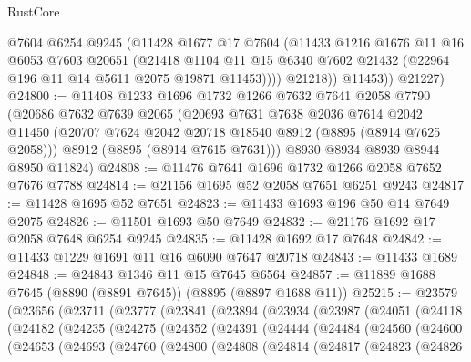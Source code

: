 \begin{lexlean}{RustCore}
\begin{coremodule}
              @7604
              @6254
              @9245
              (@11428
                @1677
                @17
                @7604
                (@11433
                  @1216
                  @1676
                  @11
                  @16
                  @6053
                  @7603
                  @20651
                  (@21418
                    @1104
                    @11
                    @15
                    @6340
                    @7602
                    @21432
                    (@22964 @196 @11 @14 @5611 @2075 @19871 @11453))))
              @21218))
          @11453))
      @21227)
@24800 := @11408
    @1233
    @1696
    @1732
    @1266
    @7632
    @7641
    @2058
    @7790
    (@20686
      @7632
      @7639
      @2065
      (@20693
        @7631
        @7638
        @2036
        @7614
        @2042
        @11450
        (@20707 @7624 @2042 @20718 @18540 @8912 (@8895 (@8914 @7625 @2058)))
        @8912
        (@8895 (@8914 @7615 @7631)))
      @8930
      @8934
      @8939
      @8944
      @8950
      @11824)
@24808 := @11476 @7641 @1696 @1732 @1266 @2058 @7652 @7676 @7788
@24814 := @21156 @1695 @52 @2058 @7651 @6251 @9243
@24817 := @11428 @1695 @52 @7651
@24823 := @11433 @1693 @196 @50 @14 @7649 @2075
@24826 := @11501 @1693 @50 @7649
@24832 := @21176 @1692 @17 @2058 @7648 @6254 @9245
@24835 := @11428 @1692 @17 @7648
@24842 := @11433 @1229 @1691 @11 @16 @6090 @7647 @20718
@24843 := @11433 @1689
@24848 := @24843 @1346 @11 @15 @7645 @6564
@24857 := @11889 @1688 @7645 (@8890 (@8891 @7645)) (@8895 (@8897 @1688 @11))
@25215 := @23579
    (@23656
      (@23711
        (@23777
          (@23841
            (@23894
              (@23934
                (@23987
                  (@24051
                    (@24118
                      (@24182
                        (@24235
                          (@24275
                            (@24352
                              (@24391
                                (@24444
                                  (@24484
                                    (@24560
                                      (@24600
                                        (@24653
                                          (@24693
                                            (@24760
                                              (@24800
                                                (@24808
                                                  (@24814
                                                    (@24817
                                                      (@24823
                                                        (@24826

\end{coremodule}
\end{lexlean}
